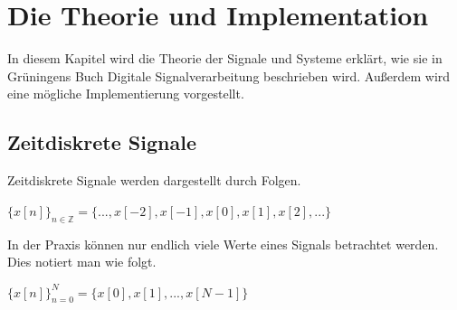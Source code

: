 \section{Die Theorie und Implementation}

In diesem Kapitel wird die Theorie der Signale und Systeme erklärt, wie sie 
in Grüningens Buch Digitale Signalverarbeitung \cite{grueningen2008dsv}
beschrieben wird. Außerdem wird eine mögliche Implementierung vorgestellt.

\subsection{Zeitdiskrete Signale}

Zeitdiskrete Signale werden dargestellt durch Folgen.
\begin{center}
    $\{x[n]\}_{n \in \mathbb{Z} } = \{ ...,x[-2],x[-1],x[0],x[1],x[2],... \}$
\end{center}

In der Praxis können nur endlich viele Werte eines Signals betrachtet werden.
Dies notiert man wie folgt.
\begin{center}
    $\{x[n]\}_{n = 0 }^{N} = \{ x[0],x[1],...,x[N-1] \}$
\end{center}


